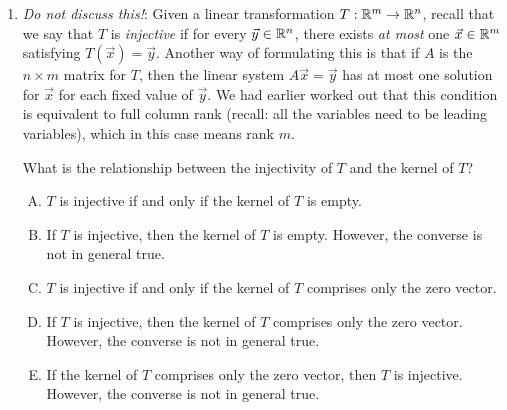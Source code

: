 \documentclass[10pt]{amsart}
\begin{document}
\begin{enumerate}
  \begin{enumerate}[(A)]
  \item The solution set is an affine linear subspace of $\R^m$ (see
    definition in Option (C) of Q1) that is a translate of the kernel,
    i.e., there is a vector $\vec{v}$ such that the vectors in the
    solution set are precisely the vectors expressible as ($\vec{v}$
    plus a vector in the kernel).
  \item The solution set coincides precisely with the kernel.
  \item The solution set comprises a single point (i.e., a single
    vector) that is not in the kernel.
  \end{enumerate}

  {\em Answer}: Option (A)

  {\em Explanation}: See Section 5 of the lecture notes titled {\tt
    Image and kernel of a linear transformation}.

  {\em Performance review}: 22 out of 28 got this. 5 chose (B), 1 chose (C).
\item {\em Do not discuss this!}: Given a linear transformation
  $T:\mathbb{R}^m \to \mathbb{R}^n$, recall that we say that $T$ is {\em injective} if
  for every $\vec{y} \in \mathbb{R}^n$, there exists {\em at most} one
  $\vec{x} \in \mathbb{R}^m$ satisfying $T(\vec{x}) = \vec{y}$. Another way of
  formulating this is that if $A$ is the $n \times m$ matrix for $T$,
  then the linear system $A\vec{x} = \vec{y}$ has at most one solution
  for $\vec{x}$ for each fixed value of $\vec{y}$. We had earlier
  worked out that this condition is equivalent to full column rank
  (recall: all the variables need to be leading variables), which in
  this case means rank $m$.

  What is the relationship between the injectivity of $T$ and the
  kernel of $T$?

  \begin{enumerate}[(A)]
  \item $T$ is injective if and only if the kernel of $T$ is empty.
  \item If $T$ is injective, then the kernel of $T$ is empty. However,
    the converse is not in general true.
  \item $T$ is injective if and only if the kernel of $T$ comprises
    only the zero vector.
  \item If $T$ is injective, then the kernel of $T$ comprises only the
    zero vector. However, the converse is not in general true.
  \item If the kernel of $T$ comprises only the zero vector, then $T$
    is injective. However, the converse is not in general true.
  \end{enumerate}


\end{enumerate}
\end{document}
